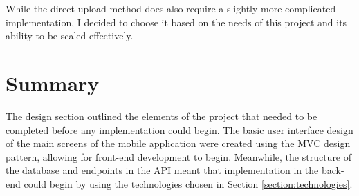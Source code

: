 While the direct upload method does also require a slightly more complicated implementation, I decided to choose it based on the needs of this project and its ability to be scaled effectively.

\section{Summary}

The design section outlined the elements of the project that needed to be completed before any implementation could begin. The basic user interface design of the main screens of the mobile application were created using the MVC design pattern, allowing for front-end development to begin. Meanwhile, the structure of the database and endpoints in the API meant that implementation in the back-end could begin by using the technologies chosen in Section \ref{section:technologies}. 





